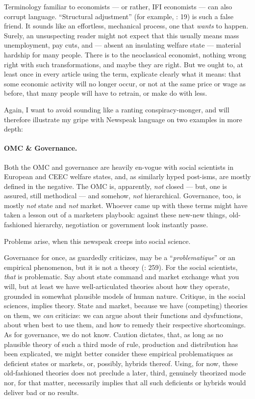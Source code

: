 Terminology familiar to economists --- or rather, \gls{IFI} economists --- can also corrupt language. ``Structural adjustment'' (for example, \citealt{Begg2008}: 19) is such a false friend. It sounds like an effortless, mechanical process, one that \emph{wants} to happen. Surely, an unsuspecting reader might not expect that this usually means mass unemployment, pay cuts, and --- absent an insulating welfare state --- material hardship for many people. There is to the neoclassical economist, nothing wrong right with such transformations, and maybe they are right. But we ought to, at least once in every article using the term, explicate clearly what it means: that some economic activity will no longer occur, or not at the same price or wage as before, that many people will have to retrain, or make do with less.

Again, I want to avoid sounding like a ranting conspiracy-monger, and will therefore illustrate my gripe with Newspeak language on two examples in more depth:

\paragraph{\gls{OMC} \& Governance.} Both the \gls{OMC} and governance are heavily en-vogue with social scientists in European and \gls{CEEC} welfare states, and, as similarly hyped post-isms, are mostly defined in the negative. The \gls{OMC} is, apparently, \emph{not} closed --- but, one is assured, still methodical --- and somehow, \emph{not} hierarchical. Governance, too, is mostly \emph{not} state and \emph{not} market. Whoever came up with these terms might have taken a lesson out of a marketers playbook: against these new-new things, old-fashioned hierarchy, negotiation or government look instantly passe. 

Problems arise, when this newspeak creeps into social science. 

Governance for once, as \citeauthor{Jachtenfuchs2001} guardedly criticizes, may be a ``\emph{problematique}'' or an empirical phenomenon, but it is not a theory (\citeyear{Jachtenfuchs2001}: 259). For the social scientists, \emph{that} is problematic. Say about state command and market exchange what you will, but at least we have well-articulated theories about how they operate, grounded in somewhat plausible models of human nature. Critique, in the social sciences, implies theory. State and market, because we have (competing) theories on them, we \emph{can} criticize: we can argue about their functions and dysfunctions, about when best to use them, and how to remedy their respective shortcomings. As for governance, we do not know. Caution dictates, that, as long as no plausible theory of such a third mode of rule, production and distribution has been explicated, we might better consider these empirical problematiques as deficient states or markets, or, possibly, hybrids thereof. Using, for now, these old-fashioned theories does not preclude a later, third, genuinely theorized mode nor, for that matter, necessarily implies that all such deficients or hybrids would deliver bad or no results.

